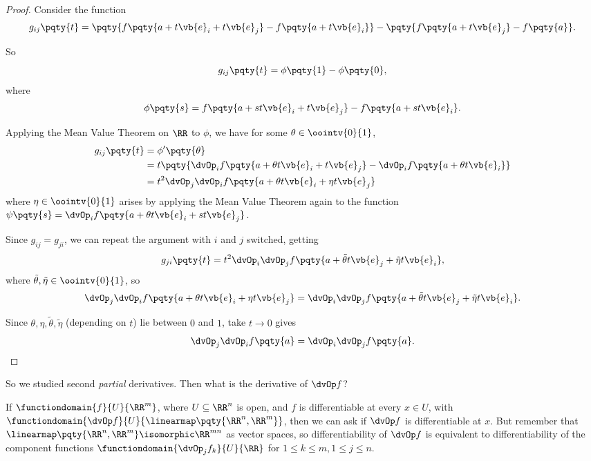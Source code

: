 \begin{proof}
    Consider the function
    \[
        g_{ij} \pqty{t} = \pqty{f \pqty{a + t \vb{e}_i + t \vb{e}_j} - f\pqty{a + t \vb{e}_i}} - \pqty{f\pqty{a + t \vb{e}_j} - f\pqty{a}}.
    \]

    So
    \[
        g_{ij} \pqty{t} = \phi\pqty{1} - \phi\pqty{0},
    \]
    where
    \[
        \phi\pqty{s} = f\pqty{a + s t \vb{e}_i + t \vb{e}_j} - f\pqty{a + s t \vb{e}_i}.
    \]

    Applying the Mean Value Theorem on \(\RR\) to \(\phi\), we have for some \(\theta \in \oointv{0}{1}\),
    \begin{align*}
        g_{ij} \pqty{t} &= \phi'\pqty{\theta} \\
        &= t \pqty{\dvOp_i f\pqty{a + \theta t \vb{e}_i + t \vb{e}_j} - \dvOp_i f\pqty{a + \theta t \vb{e}_i}} \\
        &= t^2 \dvOp_{j} \dvOp_i f\pqty{a + \theta t \vb{e}_i + \eta t \vb{e}_j}
    \end{align*}
    where \(\eta \in \oointv{0}{1}\) arises by applying the Mean Value Theorem again to the function \(\psi\pqty{s} = \dvOp_i f\pqty{a + \theta t \vb{e}_i + s t \vb{e}_j}\).

    Since \(g_{ij} = g_{ji}\), we can repeat the argument with \(i\) and \(j\) switched, getting
    \[
        g_{ji} \pqty{t} = t^2 \dvOp_{i} \dvOp_j f\pqty{a + \tilde{\theta} t \vb{e}_j + \tilde{\eta} t \vb{e}_i},
    \]
    where \(\tilde{\theta}, \tilde{\eta} \in \oointv{0}{1}\), so
    \[
        \dvOp_{j} \dvOp_i f\pqty{a + \theta t \vb{e}_i + \eta t \vb{e}_j} = \dvOp_{i} \dvOp_j f\pqty{a + \tilde{\theta} t \vb{e}_j + \tilde{\eta} t \vb{e}_i}.
    \]

    Since \(\theta, \eta, \tilde{\theta}, \tilde{\eta}\) (depending on \(t\)) lie between \(0\) and \(1\), take \(t \to 0\) gives
    \[
        \dvOp_{j} \dvOp_i f\pqty{a} = \dvOp_{i} \dvOp_j f\pqty{a}.
    \]
\end{proof}

So we studied second \emph{partial} derivatives. Then what is the derivative of \(\dvOp f\)?

If \(\functiondomain{f}{U}{\RR^m}\), where \(U \subseteq \RR^n\) is open, and \(f\) is differentiable at every \(x \in U\), with \(\functiondomain{\dvOp f}{U}{\linearmap\pqty{\RR^n, \RR^m}}\), then we can ask if \(\dvOp f\) is differentiable at \(x\). But remember that \(\linearmap\pqty{\RR^n, \RR^m} \isomorphic \RR^{mn}\) as vector spaces, so differentiability of \(\dvOp f\) is equivalent to differentiability of the component functions \(\functiondomain{\dvOp_j f_k}{U}{\RR}\) for \(1 \leq k \leq m, 1 \leq j \leq n\).

